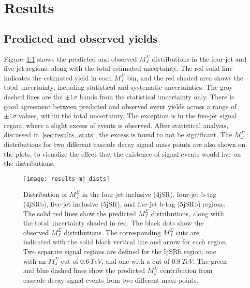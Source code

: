 \chapter{Results}\label{ch:results}

\section{Predicted and observed yields}\label{sec:results_yields}

Figure~\ref{fig:results_mj_dists} shows the predicted and observed $M_J^{\Sigma}$ distributions in the four-jet and five-jet regions, along with the total estimated uncertainty.
The red solid line indicates the estimated yield in each $M_J^{\Sigma}$ bin, and the red shaded area shows the total uncertainty, including statistical and systematic uncertainties.
The gray dashed lines are the $\pm1\sigma$ bands from the statistical uncertainty only.
There is good agreement between predicted and observed event yields across a range of $\pm1\sigma$ values, within the total uncertainty.
The exception is in the five-jet signal region, where a slight excess of events is observed.
After statistical analysis, discussed in~\ref{sec:results_stats}, the excess is found to not be significant.
The $M_J^{\Sigma}$ distributions for two different cascade decay signal mass points are also shown on the plots, to visualize the effect that the existence of signal events would hve on the distributions.

\begin{figure}[!ht]
    \centering
\texttt{[image: results\_mj\_dists]}
\caption{Distribution of $M_J^{\Sigma}$ in the four-jet inclusive (4jSR), four-jet b-tag (4jSRb), five-jet inclusive
(5jSR), and five-jet b-tag (5jSRb) regions.
The solid red lines show the predicted $M_J^{\Sigma}$ distributions, along with the total uncertainty shaded in red.
The black dots show the observed $M_J^{\Sigma}$ distributions.
The corresponding $M_J^{\Sigma}$ cuts are indicated with the solid black vertical line and arrow for each region.
Two separate signal regions are defined for the 5jSRb region, one with an $M_J^{\Sigma}$ cut of $0.6~TeV$,
and one with a cut of $0.8~TeV$.
The green and blue dashed lines show the predicted $M_J^{\Sigma}$ contribution from cascade-decay signal events
from two different mass points.
}
\label{fig:results_mj_dists}
\end{figure}

